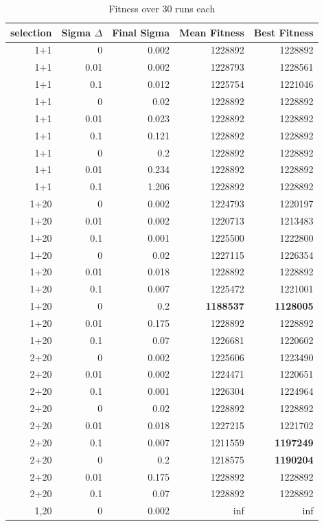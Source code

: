 \documentclass{scrartcl}
\begin{document}
\begin{table}[H]
\caption{Fitness over 30 runs each}
\begin{tabular}{r r r|r r }

selection & Sigma $\Delta$ & Final Sigma & Mean Fitness & Best Fitness \\ \hline
1+1 & 0 & 0.002 & 1228892 & 1228892 \\ 
1+1 & 0.01 & 0.002 & 1228793 & 1228561 \\ 
1+1 & 0.1 & 0.012 & 1225754 & 1221046 \\ 
1+1 & 0 & 0.02 & 1228892 & 1228892 \\ 
1+1 & 0.01 & 0.023 & 1228892 & 1228892 \\ 
1+1 & 0.1 & 0.121 & 1228892 & 1228892 \\ 
1+1 & 0 & 0.2 & 1228892 & 1228892 \\ 
1+1 & 0.01 & 0.234 & 1228892 & 1228892 \\ 
1+1 & 0.1 & 1.206 & 1228892 & 1228892 \\ 
1+20 & 0 & 0.002 & 1224793 & 1220197 \\ 
1+20 & 0.01 & 0.002 & 1220713 & 1213483 \\ 
1+20 & 0.1 & 0.001 & 1225500 & 1222800 \\ 
1+20 & 0 & 0.02 & 1227115 & 1226354 \\ 
1+20 & 0.01 & 0.018 & 1228892 & 1228892 \\ 
1+20 & 0.1 & 0.007 & 1225472 & 1221001 \\ 
1+20 & 0 & 0.2 & \textbf{1188537} & \textbf{1128005} \\ 
1+20 & 0.01 & 0.175 & 1228892 & 1228892 \\ 
1+20 & 0.1 & 0.07 & 1226681 & 1220602 \\ 
2+20 & 0 & 0.002 & 1225606 & 1223490 \\ 
2+20 & 0.01 & 0.002 & 1224471 & 1220651 \\ 
2+20 & 0.1 & 0.001 & 1226304 & 1224964 \\ 
2+20 & 0 & 0.02 & 1228892 & 1228892 \\ 
2+20 & 0.01 & 0.018 & 1227215 & 1221702 \\ 
2+20 & 0.1 & 0.007 & 1211559 & \textbf{1197249} \\ 
2+20 & 0 & 0.2 & 1218575 & \textbf{1190204} \\ 
2+20 & 0.01 & 0.175 & 1228892 & 1228892 \\ 
2+20 & 0.1 & 0.07 & 1228892 & 1228892 \\ 
1,20 & 0 & 0.002 & inf & inf \\ 

\end{tabular}
\end{table}
\end{document}
